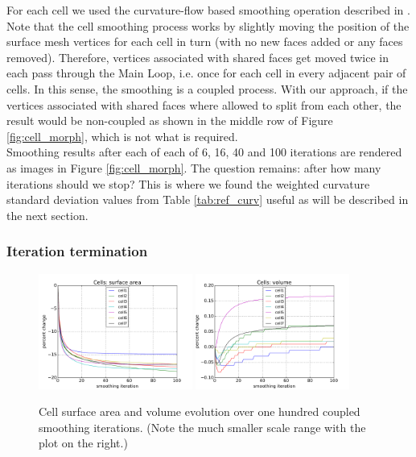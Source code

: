 \documentclass[a4paper,10pt]{article}
\begin{document}
For each cell we used the curvature-flow based smoothing operation described in \cite{Desbrun:1999:IFI:311535.311576}. Note that the cell smoothing process works by slightly moving the position of the surface mesh vertices for each cell in turn (with no new faces added or any faces removed). Therefore, vertices associated with shared faces get moved twice in each pass through the Main Loop, i.e. once for each cell in every adjacent pair of cells. In this sense, the smoothing is a coupled process. With our approach, if the vertices associated with shared faces where allowed to split from each other, the result would be non-coupled as shown in the middle row of Figure \ref{fig:cell_morph}, which is not what is required.\\

Smoothing results after each of each of 6, 16, 40 and 100 iterations are rendered as images in Figure \ref{fig:cell_morph}.
The question remains: after how many iterations should we stop? This is where we found the weighted curvature standard deviation values from Table \ref{tab:ref_curv} useful as will be described in the next section.\\

\subsubsection{Iteration termination} \label{sec:termination}

\begin{figure}[H]
\begin{center}
\includegraphics[width=0.45\textwidth]{images/cell_surf_100.pdf}
\includegraphics[width=0.45\textwidth]{images/cell_vol_100.pdf}
\end{center}
\caption{Cell surface area and volume evolution over one hundred coupled smoothing iterations. (Note the much smaller scale range with the plot on the right.)}
\label{fig:100_iterations}
\end{figure}
\end{document}
